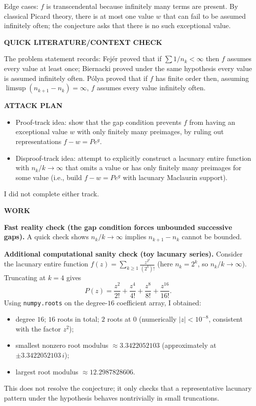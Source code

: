Edge cases: $f$ is transcendental because infinitely many terms are present. By classical Picard theory, there is at most one value $w$ that can fail to be assumed infinitely often; the conjecture asks that there is no such exceptional value.

\medskip
\noindent\textbf{QUICK LITERATURE/CONTEXT CHECK}

The problem statement records: Fej\'er proved that if $\sum 1/n_k<\infty$ then $f$ assumes every value at least once; Biernacki proved under the same hypothesis every value is assumed infinitely often. P\'olya proved that if $f$ has finite order then, assuming $\limsup (n_{k+1}-n_k)=\infty$, $f$ assumes every value infinitely often.

\medskip
\noindent\textbf{ATTACK PLAN}

\begin{itemize}
\item Proof-track idea: show that the gap condition prevents $f$ from having an exceptional value $w$ with only finitely many preimages, by ruling out representations $f-w = P e^g$.
\item Disproof-track idea: attempt to explicitly construct a lacunary entire function with $n_k/k\to\infty$ that omits a value or has only finitely many preimages for some value (i.e., build $f-w=P e^g$ with lacunary Maclaurin support).
\end{itemize}
I did not complete either track.

\medskip
\noindent\textbf{WORK}

\noindent\textbf{Fast reality check (the gap condition forces unbounded successive gaps).}
A quick check shows $n_k/k\to\infty$ implies $n_{k+1}-n_k$ cannot be bounded.

\noindent\textbf{Additional computational sanity check (toy lacunary series).}
Consider the lacunary entire function $f(z)=\sum_{k\ge 1} \frac{z^{2^k}}{(2^k)!}$ (here $n_k=2^k$, so $n_k/k\to\infty$). Truncating at $k=4$ gives
\[
P(z)=\frac{z^2}{2!}+\frac{z^4}{4!}+\frac{z^8}{8!}+\frac{z^{16}}{16!}.
\]
Using \texttt{numpy.roots} on the degree-$16$ coefficient array, I obtained:
\begin{itemize}
\item degree $16$; $16$ roots in total; $2$ roots at $0$ (numerically $|z|<10^{-8}$, consistent with the factor $z^2$);
\item smallest nonzero root modulus $\approx 3.3422052103$ (approximately at $\pm 3.3422052103\, i$);
\item largest root modulus $\approx 12.2987828606$.
\end{itemize}
This does not resolve the conjecture; it only checks that a representative lacunary pattern under the hypothesis behaves nontrivially in small truncations.


